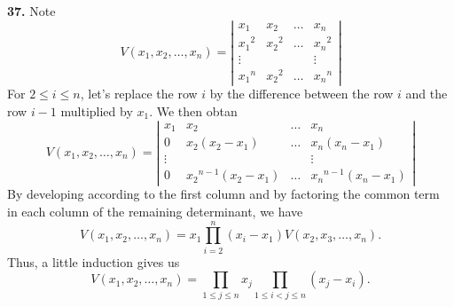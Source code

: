\documentclass[a4paper,12pt]{article}
\newcommand{\newpar}[1]{\bigskip \noindent \textbf{#1.}}
\begin{document}
\newpar{37}  Note
\[ V(x_1, x_2, \ldots, x_n) = \left|
\begin{array}{cccc}
  x_1 & x_2 & \ldots & x_n \\
  x_1{}^2 & x_2{}^2 & \ldots & x_n{}^2 \\
  \vdots & & & \vdots \\
  x_1{}^n & x_2{}^2 & \ldots & x_n{}^n
\end{array} \right| \]
For $2\le i\le n$, let's replace the row $i$ by the difference between
the row $i$ and the row $i-1$ multiplied by $x_1$.  We then obtan
\[ V(x_1, x_2, \ldots, x_n) = \left|
\begin{array}{cccc}
  x_1 & x_2 & \ldots & x_n \\
  0 & x_2(x_2 - x_1)& \ldots & x_n(x_n - x_1) \\
  \vdots & & & \vdots \\
  0 & x_2{}^{n-1}(x_2 - x_1) & \ldots & x_n{}^{n-1}(x_n - x_1)
\end{array} \right| \]
By developing according to the first column and by factoring the
common term in each column of the remaining determinant, we have
\[ V(x_1, x_2, \ldots, x_n) =
x_1 \prod_{i=2}^n(x_i-x_1) V(x_2, x_3, \ldots, x_n).\]
Thus, a little induction gives us
\[ V(x_1, x_2, \ldots, x_n) =
\prod_{1\le j\le n} x_j\prod_{1\le i<j\le n}(x_j - x_i).\]
\end{document}
